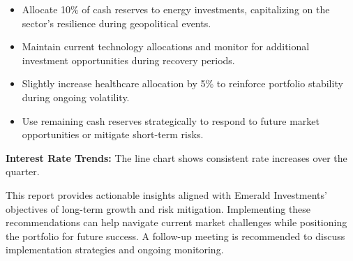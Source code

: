 \documentclass[11pt]{article}
\begin{document}
\begin{itemize}[leftmargin=1.5em, itemsep=2pt]
  \item Allocate 10\% of cash reserves to energy investments, capitalizing on
  the sector's resilience during geopolitical events.
\end{itemize}
\begin{itemize}[leftmargin=1.5em, itemsep=2pt]
  \item Maintain current technology allocations and monitor for additional
  investment opportunities during recovery periods.
\end{itemize}
\begin{itemize}[leftmargin=1.5em, itemsep=2pt]
  \item Slightly increase healthcare allocation by 5\% to reinforce portfolio
  stability during ongoing volatility.
\end{itemize}
\begin{itemize}[leftmargin=1.5em, itemsep=2pt]
  \item Use remaining cash reserves strategically to respond to future market
  opportunities or mitigate short-term risks.
\end{itemize}

\textbf{Interest Rate Trends:} The line chart shows consistent rate increases
over the quarter.

\begin{center}
\end{center}

This report provides actionable insights aligned with Emerald Investments'
objectives of long-term growth and risk mitigation. Implementing these
recommendations can help navigate current market challenges while positioning
the portfolio for future success. A follow-up meeting is recommended to
discuss implementation strategies and ongoing monitoring.
\end{document}
